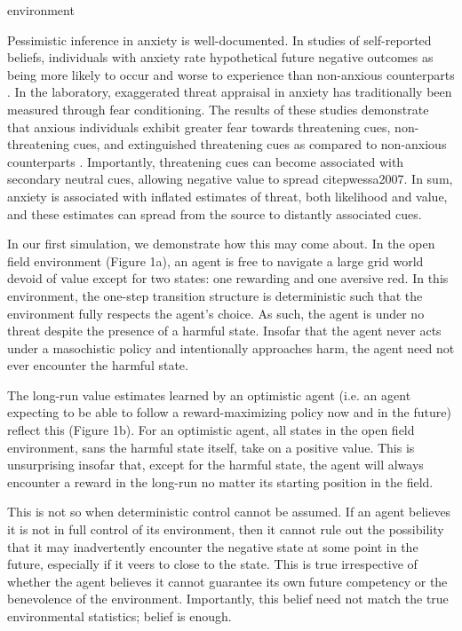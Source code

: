 environment\documentclass[11pt]{article} %
\begin{document}
Pessimistic inference in anxiety is well-documented. In studies of self-reported beliefs,
individuals with anxiety rate
hypothetical future negative outcomes as being more likely to occur and worse to
experience than non-anxious counterparts \citep{ButlerMathews1983, ButlerMathews1987,
Foa1996, MacLeod1996, MacLeod1997, Luten1997, Stober1997, Borkovec1999, Maner2006,
Mitte2007, Miranda2007}. In the laboratory, exaggerated threat appraisal in anxiety
has traditionally been measured through fear conditioning. The results of these
studies demonstrate that anxious individuals exhibit greater fear towards threatening
cues, non-threatening cues, and extinguished threatening cues as compared to non-anxious
counterparts \citep{lissek2005, MinekaOehlberg2008, Duits2015}. Importantly, threatening
cues can become associated with secondary neutral cues, allowing negative value to
spread citep{wessa2007}. In sum, anxiety is associated with inflated estimates of
threat, both likelihood and value, and these estimates can spread from the source
to distantly associated cues.

In our first simulation, we demonstrate how this may come about. In the open field
environment (Figure 1a), an agent is free to navigate a large grid world devoid
of value except for two states: one rewarding and one aversive red. In this environment,
the one-step transition structure is deterministic such that the environment
fully respects the agent's choice. As such, the agent is under no threat despite
the presence of a harmful state. Insofar that the agent never acts under a
masochistic policy and intentionally approaches harm, the agent need not ever
encounter the harmful state.

The long-run value estimates learned by an optimistic agent (i.e. an agent expecting
to be able to follow a reward-maximizing policy now and in the future) reflect this
(Figure 1b). For an optimistic agent, all states in the open field environment,
sans the harmful state itself, take on a positive value. This is unsurprising
insofar that, except for the harmful state, the agent will always encounter
a reward in the long-run no matter its starting position in the field.



This is not so when deterministic control cannot be assumed. If an agent believes
it is not in full control of its environment, then it cannot rule out the possibility
that it may inadvertently encounter the negative state at some point in the future,
especially if it veers to close to the state. This is true irrespective of whether
the agent believes it cannot guarantee its own future competency or the benevolence
of the environment. Importantly, this belief need not match the true environmental
statistics; belief is enough.
\end{document}
